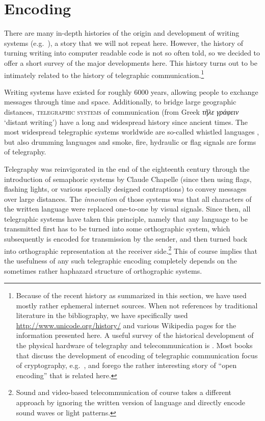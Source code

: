 \chapter{Encoding}
\label{encoding}

There are many in-depth histories of the origin and development of writing systems (e.g.~\citet{Robinson1997,Powell2012}), a story that we will not repeat here. However, the history of turning writing into computer readable code is not so often told, so we decided to offer a short survey of the major developments here. This history turns out to be intimately related to the history of telegraphic communication.\footnote{Because of the recent history as summarized in this section, we have used mostly rather ephemeral internet sources. When not references by traditional literature in the bibliography, we have specifically used \url{http://www.unicode.org/history/} and various Wikipedia pages for the information presented here. A useful survey of the historical development of the physical hardware of telegraphy and telecommunication is \citet{Huurdeman2003}. Most books that discuss the development of encoding of telegraphic communication focus of cryptography, e.g.~\citet{Singh1999}, and forego the rather interesting story of ``open encoding'' that is related here.}

Writing systems have existed for roughly 6000 years, allowing people to exchange messages through time and space. Additionally, to bridge large geographic distances, \textsc{telegraphic systems} of communication (from Greek \emph{τῆλε γράφειν} `distant writing') have a long and widespread history since ancient times. The most widespread telegraphic systems worldwide are so-called whistled languages \citep{Meyer2015}, but also drumming languages \citep{Meyer_etal2012} and smoke, fire, hydraulic or flag signals are forms of telegraphy. 

Telegraphy was reinvigorated in the end of the eighteenth century through the introduction of semaphoric systems by Claude Chapelle (since then using flags, flashing lights, or various specially designed contraptions) to convey messages over large distances. The \textit{innovation} of those systems was that all characters of the written language were replaced one-to-one by visual signals. Since then, all telegraphic systems have taken this principle, namely that any language to be transmitted first has to be turned into some orthographic system, which subsequently is encoded for transmission by the sender, and then turned back into orthographic representation at the receiver side.\footnote{Sound and video-based telecommunication of course takes a different approach by ignoring the written version of language and directly encode sound waves or light patterns.} This of course implies that the usefulness of any such telegraphic encoding completely depends on the sometimes rather haphazard structure of orthographic systems.

